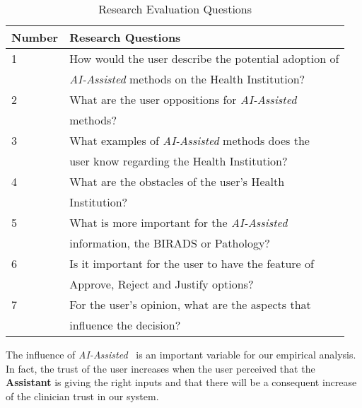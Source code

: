 \begin{table}[h]
\centering
\begin{tabular}{l|l}
Number & Research Questions                             	         \\ \hline
1      & How would the user describe the potential adoption of   \\
       & \textit{AI-Assisted} methods on the Health Institution? \\ \hline
2      & What are the user oppositions for \textit{AI-Assisted}	 \\
       & methods?                                                \\ \hline
3      & What examples of \textit{AI-Assisted} methods does the  \\
       & user know regarding the Health Institution?             \\ \hline
4      & What are the obstacles of the user's Health             \\
       & Institution?                                            \\ \hline
5      & What is more important for the \textit{AI-Assisted}     \\
       & information, the BIRADS or Pathology?                   \\ \hline
6      & Is it important for the user to have the feature of		 \\
       & Approve, Reject and Justify options?                    \\ \hline
7      & For the user's opinion, what are the aspects that       \\
       & influence the decision?                                 \\ \hline

\end{tabular}
\caption{Research Evaluation Questions}
\label{table:usability_evaluation_questions}
\end{table}

\hfill

The influence of \textit{AI-Assisted}~\cite{goodfellow2016deep} is an important variable for our empirical analysis. In fact, the trust of the user increases when the user perceived that the \textbf{Assistant} is giving the right inputs and that there will be a consequent increase of the clinician trust in our system.

\clearpage

